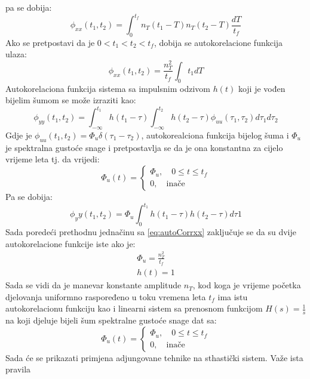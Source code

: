 pa se dobija:
\begin{equation}
    \phi_{xx}(t_1,t_2)=\int_{0}^{t_f}n_T(t_1-T)n_T(t_2-T)\frac{dT}{t_f}
\end{equation}
Ako se pretpostavi da je $0<t_1<t_2<t_f$, dobija se autokorelacione funkcija ulaza:
\begin{equation}
    \phi_{xx}(t_1,t_2)=\frac{n_T^2}{t_f}\int_{0}{t_1}dT
    \label{eq:autoCorrxx}
\end{equation}
Autokorelaciona funkcija sistema sa impulsnim odzivom $h(t)$ koji je vođen bijelim 
šumom se može izraziti kao:
\begin{equation}
    \phi_{yy}(t_1,t_2)=\int_{-\infty}^{t_1}h(t_1-\tau)\int_{-\infty}^{t_2}h(t_2-\tau)\phi_{uu}(\tau_1,\tau_2)d\tau_1d\tau_2
\end{equation}
Gdje je $\phi_{uu}(t_1,t_2)= \Phi_u\delta(\tau_1-\tau_2)$, autokorealciona funkcija bijelog šuma
i $\Phi_u$ je spektralna gustoće snage i pretpostavlja se da je ona konstantna za cijelo vrijeme leta tj. da vrijedi:
\begin{equation}
    \Phi_u(t) = \begin{cases}
        \Phi_u, \quad 0 \leq t \leq t_f \\
        0, \quad \text{inače} 
    \end{cases}
\end{equation}
Pa se dobija:
\begin{equation}
    \phi_yy(t_1,t_2) = \Phi_u\int_0^{t_1}h(t_1-\tau)h(t_2-\tau)d\tau1
\end{equation}
Sada poredeći prethodnu jednačinu sa \ref{eq:autoCorrxx} zaključuje se da 
su dvije autokorelacione funkcije iste ako je: 
\begin{eqnarray}
    \Phi_u =\frac{n_T^2}{t_f} \\
    h(t)=1
\end{eqnarray}
Sada se vidi da je manevar konstante amplitude $n_T$, kod koga je vrijeme 
početka djelovanja uniformno raspoređeno u toku vremena leta $t_f$ ima istu 
autokorelacionu funkciju kao i linearni sistem sa prenosnom funkcijom $H(s)=\frac{1}{s}$ 
na koji djeluje bijeli šum spektralne gustoće snage dat sa: 
\begin{equation*}
    \Phi_u(t) = \begin{cases}
        \Phi_u, \quad 0 \leq t \leq t_f \\
        0, \quad \text{inače}
    \end{cases}
\end{equation*}
Sada će se prikazati primjena adjungovane tehnike na sthastički sistem. Važe ista pravila 
